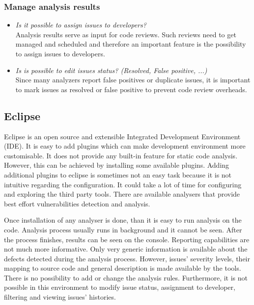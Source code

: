 \documentclass[conference]{IEEEtran}
\begin{document}
\subsubsection{Manage analysis results}
\label{subsubsec:evaluation_manage}
\begin{itemize}
	\item \textit{Is it possible to assign issues to developers?} \\
	Analysis results serve as input for code reviews. Such reviews need to get managed and scheduled and therefore an important feature is the possibility to assign issues to developers.
	
	\item \textit{Is is possible to edit issues status? (Resolved, False positive, ...)} \\
	Since many analyzers report false positives or duplicate issues, it is important to mark issues as resolved or false positive to prevent code review overheads.
\end{itemize}


\subsection{Eclipse}
\label{subsec:evaluation_eclipse}

Eclipse is an open source and extensible Integrated Development Environment (IDE). It is easy to add plugins which can make development environment more customisable. It does not provide any built-in feature for static code analysis. However, this can be achieved by installing some available plugins. Adding additional plugins to eclipse is sometimes not an easy task because it is not intuitive regarding the configuration. It could take a lot of time for configuring and exploring the third party tools. There are available analysers that provide best effort vulnerabilities detection and analysis.

Once installation of any analyser is done, than it is easy to run analysis on the code. Analysis process usually runs in background and it cannot be seen. After the process finishes, results can be seen on the console. Reporting capabilities are not much more informative. Only very generic information is available about the defects detected during the analysis process. However, issues' severity levels, their mapping to source code and general description is made available by the tools. There is no possibility to add or change the analysis rules. Furthermore, it is not possible in this environment to modify issue status, assignment to developer, filtering and viewing issues' histories.
\end{document}
